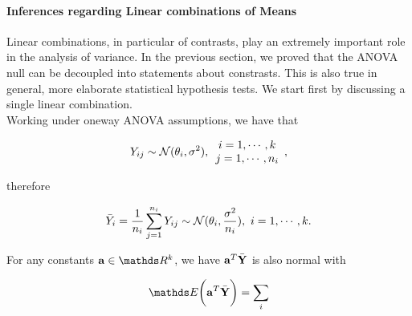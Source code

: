 \documentclass{homework}
\begin{document}
\paragraph{\textbf{Inferences regarding Linear combinations of Means}}

Linear combinations, in particular of contrasts, play an extremely important role in the analysis of variance. In the previous section, we proved that the ANOVA null can be decoupled into statements about constrasts. This is also true in general, more elaborate statistical hypothesis tests. We start first by discussing a single linear combination. \\

Working under oneway ANOVA assumptions, we have that

$$
Y_{ij} \sim \mathcal{N}(\theta_i, \sigma^2), \begin{array}{c}
     i = 1, \cdots, k  \\
     j = 1, \cdots, n_i 
\end{array},
$$

therefore 

$$
\Bar{Y}_i = \frac{1}{n_i}\sum_{j=1}^{n_i} Y_{ij} \sim \mathcal{N}(\theta_i, \frac{\sigma^2}{n_i}), \textnormal{ } i = 1, \cdots, k.
$$

For any constants ${\bf a} \in \R^{k}$, we have ${\bf a}^{T} \bar{{\bf Y}}$ is also normal with 

\begin{align*}
    \E\bigg({\bf a}^{T} \bar{{\bf Y}}\bigg) = \sum_{i}
\end{align*}
\end{document}

